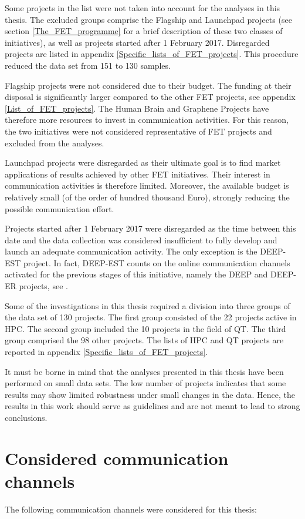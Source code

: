 Some projects in the list were not taken into account for the analyses in this thesis. The excluded groups comprise the Flagship and Launchpad projects (see section \ref{The_FET_programme} for a brief description of these two classes of initiatives), as well as projects started after 1 February 2017. Disregarded projects are listed in appendix \ref{Specific_lists_of_FET_projects}. This procedure reduced the data set from 151 to 130 samples.

Flagship projects were not considered due to their budget. The funding at their disposal is significantly larger compared to the other FET projects, see appendix \ref{List_of_FET_projects}. The Human Brain and Graphene Projects have therefore more resources to invest in communication activities. For this reason, the two initiatives were not considered representative of FET projects and excluded from the analyses. 

Launchpad projects were disregarded as their ultimate goal is to find market applications of results achieved by other FET initiatives. Their interest in communication activities is therefore limited. Moreover, the available budget is relatively small (of the order of hundred thousand Euro), strongly reducing the possible communication effort. 

Projects started after 1 February 2017 were disregarded as the time between this date and the data collection was considered insufficient to fully develop and launch an adequate communication activity. The only exception is the DEEP-EST project. In fact, DEEP-EST counts on the online communication channels activated for the previous stages of this initiative, namely the DEEP and DEEP-ER projects, see \cite{DEEPprojects}.   

Some of the investigations in this thesis required a division into three groups of the data set of 130 projects. The first group consisted of the 22 projects active in HPC. The second group included the 10 projects in the field of QT. The third group comprised the 98 other projects. The lists of HPC and QT projects are reported in appendix \ref{Specific_lists_of_FET_projects}.

It must be borne in mind that the analyses presented in this thesis have been performed on small data sets. The low number of projects indicates that some results may show limited robustness under small changes in the data. Hence, the results in this work should serve as guidelines and are not meant to lead to strong conclusions.  

\section{Considered communication channels} \label{Considered_channels}
The following communication channels were considered for this thesis:   

